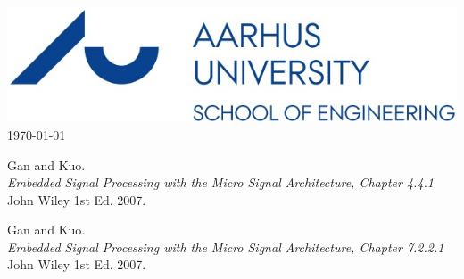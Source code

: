 \documentclass[12pt]{article}
\begin{document}
\begin{titlepage}
		
		\includegraphics[scale=0.5]{Img/logo.jpg}\\[1cm]
		
		
		{\large \today}\\[0.5cm] %
		
		
		\vfill %
		
	\end{titlepage}
	
\newpage
\tableofcontents
\newpage
\listoffigures
\newpage

\hypersetup{linkcolor=blue}


















\begin{thebibliography}{9}

Gan and Kuo. \\
\textit{Embedded Signal Processing with the Micro Signal Architecture, Chapter 4.4.1}\\ 
John Wiley 1st Ed. 2007.
 
Gan and Kuo. \\
\textit{Embedded Signal Processing with the Micro Signal Architecture, Chapter 7.2.2.1}\\ 
John Wiley 1st Ed. 2007.
  
\end{thebibliography}
\end{document}
